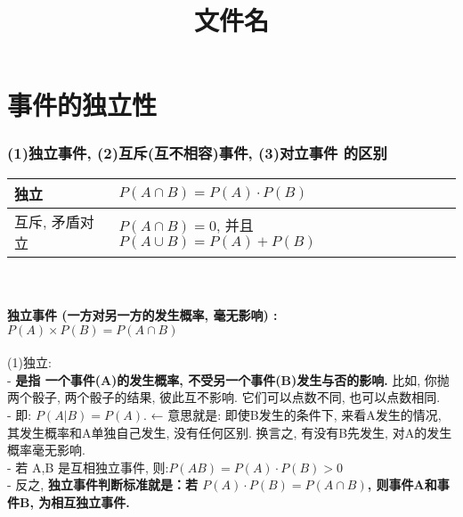 \documentclass[UTF8]{ctexart}
\title{文件名}
\begin{document}
	\tableofcontents %
	\date{} %
	\maketitle  %
	
		
	
	
	\part{ 事件的独立性}
	
	
	
	\section{(1)独立事件, (2)互斥(互不相容)事件, (3)对立事件 的区别 }	
	
	
	\begin{tabular}{|l|l|}
		\hline
		独立 &   $P(A \cap B)=P(A) \cdot P(B)$ \\	
		\hline
		互斥, 矛盾对立 &  $P(A \cap B)=0$, 并且 $P(A \cup B)=P(A) + P(B)$ \\	
		\hline
	\end{tabular} \\
	
	
	
	
	\subsection{独立事件 (一方对另一方的发生概率, 毫无影响) : \\ $P(A)×P(B)=P(A \cap B)$}
	
	(1)独立: \\
	- \textbf{是指 一个事件(A)的发生概率, 不受另一个事件(B)发生与否的影响.} 比如, 你抛两个骰子, 两个骰子的结果, 彼此互不影响. 它们可以点数不同, 也可以点数相同. \\
	- 即: $ P(A|B)=P(A)$.  ← 意思就是: 即使B发生的条件下, 来看A发生的情况, 其发生概率和A单独自己发生, 没有任何区别. 换言之, 有没有B先发生, 对A的发生概率毫无影响.\\
	- 若 A,B 是互相独立事件, 则:$ P(AB)=P(A) \cdot P(B) > 0$ \\
	- 反之, \textbf{独立事件判断标准就是：若 $P(A) \cdot P(B)=P(A \cap B)$, 则事件A和事件B, 为相互独立事件.}  \\
	
\end{document}
